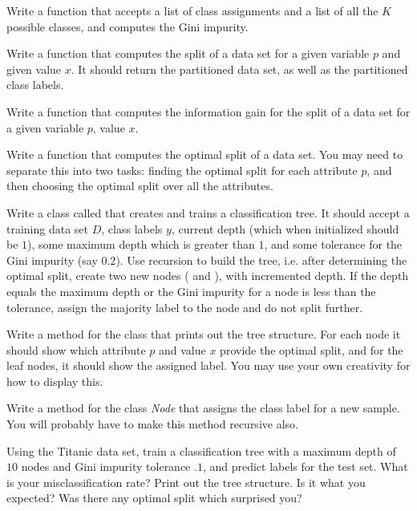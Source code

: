 
Write a function that accepts a list of class assignments and a list of all the $K$ possible classes, and computes the Gini impurity.

Write a function that computes the split of a data set for a given variable $p$ and given value $x$. It should return the partitioned data set, as well as the partitioned class labels.

Write a function that computes the information gain for the split of a data set for a given variable $p$, value $x$.

Write a function that computes the optimal split of a data set. You may need to separate this into two tasks: finding the optimal split for each attribute $p$, and then choosing the optimal split over all the attributes.

Write a class called  that creates and trains a classification tree. It should accept a training data set $D$, class labels $y$, current depth (which when initialized should be $1$), some maximum depth which is greater than $1$, and some tolerance for the Gini impurity (say $0.2$). Use recursion to build the tree, i.e. after determining the optimal split, create two new nodes ( and ), with incremented depth. If the depth equals the maximum depth or the Gini impurity for a node is less than the tolerance, assign the majority label to the node and do not split further.

Write a method for the class  that prints out the tree structure. For each node it should show which attribute $p$ and value $x$ provide the optimal split, and for the leaf nodes, it should show the assigned label. You may use your own creativity for how to display this.

Write a method for the class \emph{Node} that assigns the class label for a new sample. You will probably have to make this method recursive also.

Using the Titanic data set, train a classification tree with a maximum depth of $10$ nodes and Gini impurity tolerance $.1$, and predict labels for the test set. What is your misclassification rate? Print out the tree structure. Is it what you expected? Was there any optimal split which surprised you?

